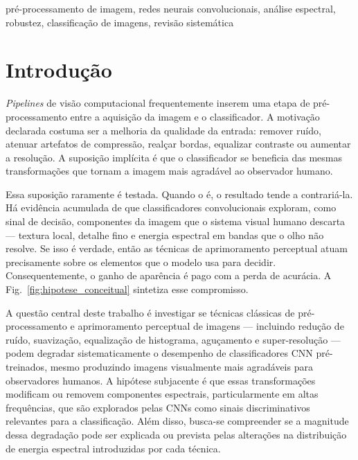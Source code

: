 \documentclass[conference]{IEEEtran}
\begin{document}
\begin{IEEEkeywords}
pré-processamento de imagem, redes neurais convolucionais, análise espectral,
robustez, classificação de imagens, revisão sistemática
\end{IEEEkeywords}

\section{Introdução}

\textit{Pipelines} de visão computacional frequentemente inserem uma etapa de
pré-processamento entre a aquisição da imagem e o classificador. A motivação
declarada costuma ser a melhoria da qualidade da entrada: remover ruído,
atenuar artefatos de compressão, realçar bordas, equalizar contraste ou
aumentar a resolução. A suposição implícita é que o classificador se beneficia
das mesmas transformações que tornam a imagem mais agradável ao observador
humano.

Essa suposição raramente é testada. Quando o é, o resultado tende a
contrariá-la. Há evidência acumulada de que classificadores convolucionais
exploram, como sinal de decisão, componentes da imagem que o sistema visual
humano descarta --- textura local, detalhe fino e energia espectral em bandas
que o olho não resolve. Se isso é verdade, então as técnicas de aprimoramento
perceptual atuam precisamente sobre os elementos que o modelo usa para decidir.
Consequentemente, o ganho de aparência é pago com a perda de acurácia. A Fig.~\ref{fig:hipotese_conceitual}
sintetiza esse compromisso.

A questão central deste trabalho é investigar se técnicas clássicas de
pré-processamento e aprimoramento perceptual de imagens --- incluindo redução
de ruído, suavização, equalização de histograma, aguçamento e super-resolução
--- podem degradar sistematicamente o desempenho de classificadores CNN
pré-treinados, mesmo produzindo imagens visualmente mais agradáveis para
observadores humanos. A hipótese subjacente é que essas transformações
modificam ou removem componentes espectrais, particularmente em altas
frequências, que são explorados pelas CNNs como sinais discriminativos
relevantes para a classificação. Além disso, busca-se compreender se a
magnitude dessa degradação pode ser explicada ou prevista pelas alterações na
distribuição de energia espectral introduzidas por cada técnica.
\end{document}
